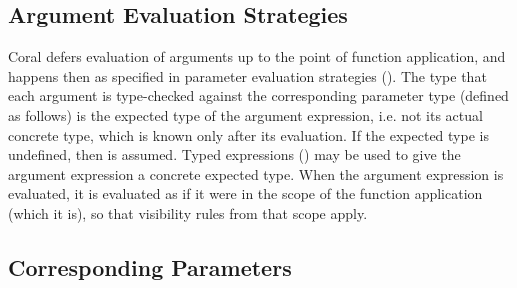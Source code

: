 \subsection{Argument Evaluation Strategies}
\label{sec:arg-eval-strategies}

Coral defers evaluation of arguments up to the point of function application, and happens then as specified in parameter evaluation strategies (). The type that each argument is type-checked against the corresponding parameter type (defined as follows) is the expected type of the argument expression, i.e. not its actual concrete type, which is known only after its evaluation. If the expected type is undefined, then  is assumed. Typed expressions () may be used to give the argument expression a concrete expected type. When the argument expression is evaluated, it is evaluated as if it were in the scope of the function application (which it is), so that visibility rules from that scope apply. 






\subsection{Corresponding Parameters}
\label{sec:corresponding-parameters}

